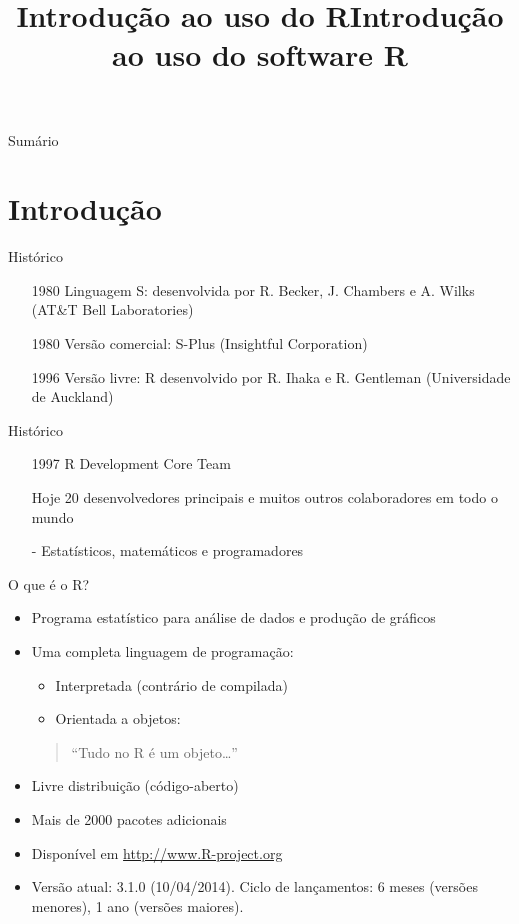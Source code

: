 \documentclass[10pt,handout]{beamer}\usepackage[]{graphicx}\usepackage[]{color}
\title{Introdução ao uso do R}
\title[Módulo I\\ Básico]{Introdução ao uso do software R}
\begin{document}
\begin{frame}
\maketitle
\end{frame}

\begin{frame}{Sumário}
\tableofcontents
\end{frame}

\section{Introdução}

\begin{frame}{Histórico}
\begin{itemize}
\item[1980] Linguagem S: desenvolvida por R. Becker, J. Chambers e
  A. Wilks (AT\&T Bell Laboratories)
\item[1980] Versão comercial: S-Plus (Insightful Corporation)
\item[1996] Versão livre: R desenvolvido por R. Ihaka e R. Gentleman
  (Universidade de Auckland)
\end{itemize}
\end{frame}

\begin{frame}{Histórico}
\begin{itemize}
\item[1997] R Development Core Team
\item[Hoje] 20 desenvolvedores principais e muitos outros colaboradores
  em todo o mundo
\item[-] Estatísticos, matemáticos e programadores
\end{itemize}
\end{frame}

\begin{frame}{O que é o R?}
\begin{itemize}
\item Programa estatístico para análise de dados e produção de
  gráficos\pause
\item Uma completa linguagem de programação:
    \begin{itemize}
    \item Interpretada (contrário de compilada)\pause
    \item Orientada a objetos:
    \end{itemize}
\begin{quote}
    ``Tudo no R é um objeto\ldots''
\end{quote}\pause
\item Livre distribuição (código-aberto)\pause
\item Mais de 2000 pacotes adicionais\pause
\item Disponível em \url{http://www.R-project.org} \pause
\item Versão atual: 3.1.0 (10/04/2014). Ciclo de lançamentos: 6 meses
  (versões menores), 1 ano (versões maiores).
\end{itemize}
\end{frame}
\end{document}

